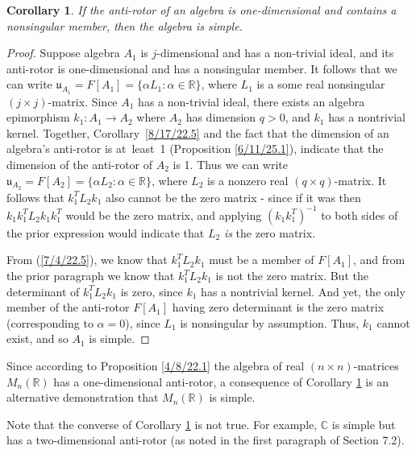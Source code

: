 \documentclass{amsart}
\newtheorem{corollary}[theorem]{Corollary}
\theoremstyle{definition}
\numberwithin{theorem}{section}
\numberwithin{equation}{section}
\begin{document}
\begin{corollary}\label{8/17/22.1} If the anti-rotor of an algebra is one-dimensional and contains a nonsingular member, then the algebra is simple. \end{corollary}

\begin{proof} Suppose algebra $A_1$ is $j$-dimensional and has a non-trivial ideal, and its anti-rotor is one-dimensional and has a nonsingular member.  It follows that we can write $\mathfrak{u}_{A_1} = F[A_1] = \{\alpha L_1:\alpha\in \mathbb{R}\}$, where $L_1$ is a some real nonsingular $(j\times j)$-matrix.  Since $A_1$ has a non-trivial ideal, there exists an algebra epimorphism $k_1:A_1\rightarrow A_2$ where $A_2$ has dimension $q>0$, and $k_1$ has a nontrivial kernel.  Together, \mbox{Corollary \ref{8/17/22.5}} and the fact that the dimension of an algebra's anti-rotor is \mbox{at least 1} (Proposition \ref{6/11/25.1}), indicate that the dimension of the anti-rotor of $A_2$ is 1.   Thus we can write $\mathfrak{u}_{A_2} = F[A_2] = \{\alpha L_2:\alpha\in \mathbb{R}\}$, where $L_2$ is a nonzero real $(q\times q)$-matrix.  It follows that $k_1^T L_2 k_1$ also cannot be the zero matrix - since if it was then $k_1k_1^T L_2 k_1k_1^T$ would be the zero matrix, and applying $(k_1k_1^T)^{-1}$ to both sides of the prior expression would indicate that $L_2$ {\it is} the zero matrix.  

From (\ref{7/4/22.5}), we know that $ k_1^T L_2 k_1$ must be a member of $F[A_1]$, and from the prior paragraph we know that $ k_1^T L_2 k_1$ is not the zero matrix.  But the determinant of $k_1^T L_2 k_1$ is zero, since $k_1$ has a  nontrivial kernel.  And yet, the only member of the anti-rotor $F[A_1]$ having zero determinant is the zero matrix (corresponding to $\alpha=0$), since $L_1$ is nonsingular by assumption.   Thus, $k_1$ cannot exist, and so $A_1$ is simple. \end{proof}

Since according to Proposition \ref{4/8/22.1} the algebra of real $(n\times n)$-matrices $M_n(\mathbb{R})$ has a one-dimensional anti-rotor, a consequence of Corollary \ref{8/17/22.1} is an alternative demonstration that $M_n(\mathbb{R})$ is simple.  

Note that the converse of Corollary \ref{8/17/22.1} is not true.  For example, $\mathbb{C}$ is simple but has a two-dimensional anti-rotor (as noted in the first paragraph of Section 7.2). 
  
 \newpage
     
\end{document}
